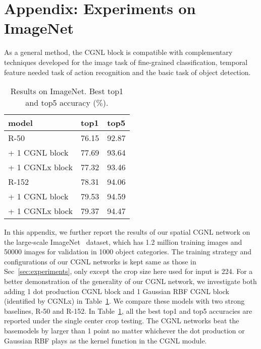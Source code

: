 \documentclass{article}
\begin{document}
\section*{Appendix: Experiments on ImageNet}
As a general method, the CGNL block is compatible with complementary techniques developed for the image task of fine-grained classification, temporal feature needed task of action recognition and the basic task of object detection.
\begin{table}[h]
  \caption{Results on ImageNet. Best top1 and top5 accuracy ($\%$).}
  \centering
  \scriptsize
  \begin{tabular}{lll}
    \toprule
    model                 & top1      & top5    \\
    \midrule
    R-50                  & 76.15     & 92.87   \\
    \cmidrule(r){2-3}
    + 1 CGNL block        & 77.69     & 93.64   \\
    + 1 CGNLx block       & 77.32     & 93.46   \\
    \midrule
    R-152                 & 78.31     & 94.06   \\
    \cmidrule(r){2-3}
    + 1 CGNL block        & 79.53     & 94.59   \\
    + 1 CGNLx block       & 79.37     & 94.47   \\
    \bottomrule
  \end{tabular}
  \label{table:imagenet}
\end{table}

In this appendix, we further report the results of our spatial CGNL network on the large-scale ImageNet~\cite{imagenet} dataset, which has 1.2 million training images and 50000 images for validation in 1000 object categories.
The training strategy and configurations of our CGNL networks is kept same as those in Sec~\ref{sec:experiments}, only except the crop size here used for input is 224.
For a better demonstration of the generality of our CGNL network, we investigate both adding 1 dot production CGNL block and 1 Gaussian RBF CGNL block (identified by CGNLx) in Table~\ref{table:imagenet}.
We compare these models with two strong baselines, R-50 and R-152.
In Table~\ref{table:imagenet}, all the best top1 and top5 accuracies are reported under the single center crop testing.
The CGNL networks beat the basemodels by larger than 1 point no matter whichever the dot production or Gaussian RBF plays as the kernel function in the CGNL module.
\clearpage{\small


}
\end{document}
